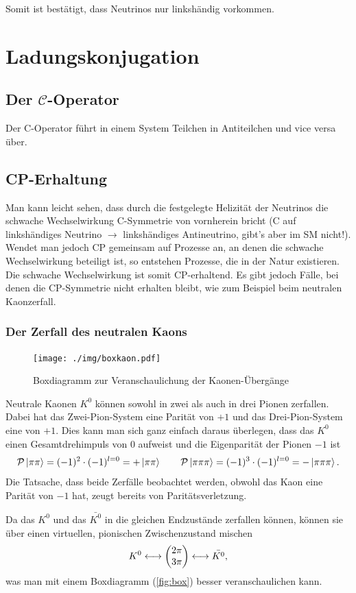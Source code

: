 Somit ist bestätigt, dass Neutrinos nur linkshändig vorkommen.

\section{Ladungskonjugation}
\subsection{Der $\mathcal{C}$-Operator}
Der C-Operator führt in einem System Teilchen in Antiteilchen und vice versa über.

\subsection{CP-Erhaltung}
Man kann leicht sehen, dass durch die festgelegte Helizität der Neutrinos die schwache Wechselwirkung C-Symmetrie von vornherein bricht (C auf linkshändiges Neutrino $\rightarrow$ linkshändiges Antineutrino, gibt's aber im SM nicht!).
Wendet man jedoch CP gemeinsam auf Prozesse an, an denen die schwache Wechselwirkung beteiligt ist, so entstehen Prozesse, die in der Natur existieren.
Die schwache Wechselwirkung ist somit CP-erhaltend.
Es gibt jedoch Fälle, bei denen die CP-Symmetrie nicht erhalten bleibt, wie zum Beispiel beim neutralen Kaonzerfall.

\subsubsection{Der Zerfall des neutralen Kaons}
\begin{figure}
	\centering
	\texttt{[image: ./img/boxkaon.pdf]}
	\caption{Boxdiagramm zur Veranschaulichung der Kaonen-Übergänge}
	\label{fig:box}
\end{figure}
Neutrale Kaonen $K^0$ können sowohl in zwei als auch in drei Pionen zerfallen.
Dabei hat das Zwei-Pion-System eine Parität von $+1$ und das Drei-Pion-System eine von $+1$.
Dies kann man sich ganz einfach daraus überlegen, dass das $K^0$ einen Gesamtdrehimpuls von 0 aufweist und die Eigenparität der Pionen $-1$ ist
\begin{equation*}
	\mathcal{P}\ket{\pi\pi} = (-1)^2\cdot (-1)^{l=0} = +\ket{\pi\pi}\qquad \mathcal{P}\ket{\pi\pi\pi} = (-1)^3\cdot (-1)^{l=0} = -\ket{\pi\pi\pi}.
\end{equation*}
Die Tatsache, dass beide Zerfälle beobachtet werden, obwohl das Kaon eine Parität von $-1$ hat, zeugt bereits von Paritätsverletzung.

Da das $K^0$ und das $\bar{K^0}$ in die gleichen Endzustände zerfallen können, können sie über einen virtuellen, pionischen Zwischenzustand mischen
\begin{equation*}
	K^0 \longleftrightarrow \begin{pmatrix} 2\pi \\ 3\pi \end{pmatrix} \longleftrightarrow \bar{K^0},
\end{equation*}
was man mit einem Boxdiagramm (\autoref{fig:box}) besser veranschaulichen kann.

